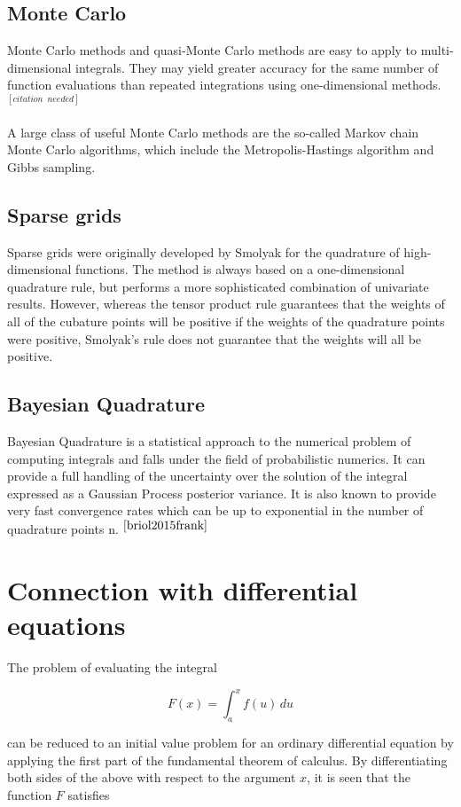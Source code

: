 \documentclass[a4paper]{article}
\begin{document}
\subsection{Monte Carlo}
Monte Carlo methods and quasi-Monte Carlo methods are easy to apply to multi-dimensional integrals. They may yield greater accuracy for the same number of function evaluations than repeated integrations using one-dimensional methods.$^{[citation \, \, \, needed]}$

A large class of useful Monte Carlo methods are the so-called Markov chain Monte Carlo algorithms, which include the Metropolis-Hastings algorithm and Gibbs sampling.

\subsection{Sparse grids}
Sparse grids were originally developed by Smolyak for the quadrature of high-dimensional functions. The method is always based on a one-dimensional quadrature rule, but performs a more sophisticated combination of univariate results. However, whereas the tensor product rule guarantees that the weights of all of the cubature points will be positive if the weights of the quadrature points were positive, Smolyak's rule does not guarantee that the weights will all be positive.

\subsection{Bayesian Quadrature}
Bayesian Quadrature is a statistical approach to the numerical problem of computing integrals and falls under the field of probabilistic numerics. It can provide a full handling of the uncertainty over the solution of the integral expressed as a Gaussian Process posterior variance. It is also known to provide very fast convergence rates which can be up to exponential in the number of quadrature points n.$^{~\cite{briol2015frank}}$

\section{Connection with differential equations}
The problem of evaluating the integral

\begin{equation*}
	F(x)=\int _{a}^{x}f(u)\,du
\end{equation*}

can be reduced to an initial value problem for an ordinary differential equation by applying the first part of the fundamental theorem of calculus. By differentiating both sides of the above with respect to the argument $x$, it is seen that the function $F$ satisfies
\end{document}
